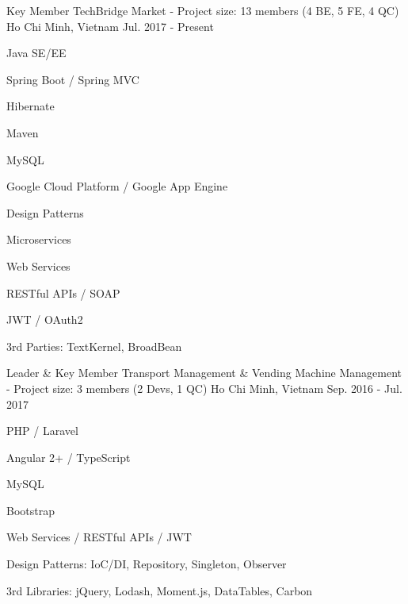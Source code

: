 

\begin{cventries}

  \cventry
    {Key Member} %
    {TechBridge Market - Project size: 13 members (4 BE, 5 FE, 4 QC)} %
    {Ho Chi Minh, Vietnam} %
    {Jul. 2017 - Present} %
    {
      \begin{cvitems} %
        \item {Java SE/EE}
        \item {Spring Boot / Spring MVC}
        \item {Hibernate}
        \item {Maven}
        \item {MySQL}
        \item {Google Cloud Platform / Google App Engine}
        \item {Design Patterns}
        \item {Microservices}
        \item {Web Services}
        \item {RESTful APIs / SOAP}
        \item {JWT / OAuth2}
        \item {3rd Parties: TextKernel, BroadBean}
      \end{cvitems}
    }

  \cventry
    {Leader \& Key Member} %
    {Transport Management \& Vending Machine Management - Project size: 3 members (2 Devs, 1 QC)} %
    {Ho Chi Minh, Vietnam} %
    {Sep. 2016 - Jul. 2017} %
    {
      \begin{cvitems} %
        \item {PHP / Laravel}
        \item {Angular 2+ / TypeScript}
        \item {MySQL}
        \item {Bootstrap}
        \item {Web Services / RESTful APIs / JWT}
        \item {Design Patterns: IoC/DI, Repository, Singleton, Observer}
        \item {3rd Libraries: jQuery, Lodash, Moment.js, DataTables, Carbon}
      \end{cvitems}
    }


\end{cventries}
